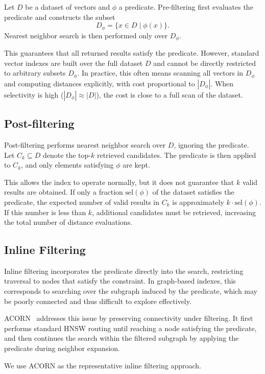 Let \( D \) be a dataset of vectors and \( \phi \) a predicate. Pre-filtering first evaluates the predicate and constructs the subset
\[
D_\phi = \{ x \in D \mid \phi(x) \}.
\]
Nearest neighbor search is then performed only over \( D_\phi \).

This guarantees that all returned results satisfy the predicate. However, standard vector indexes are built over the full dataset \( D \) and cannot be directly restricted to arbitrary subsets \( D_\phi \). In practice, this often means scanning all vectors in \( D_\phi \) and computing distances explicitly, with cost proportional to \( |D_\phi| \). When selectivity is high (\( |D_\phi| \approx |D| \)), the cost is close to a full scan of the dataset.

\subsection{Post-filtering}\label{sec:post-filtering}

Post-filtering performs nearest neighbor search over \( D \), ignoring the predicate. Let \( C_k \subseteq D \) denote the top-\(k\) retrieved candidates. The predicate is then applied to \( C_k \), and only elements satisfying \( \phi \) are kept.

This allows the index to operate normally, but it does not guarantee that \(k\) valid results are obtained. If only a fraction \( \text{sel}(\phi) \) of the dataset satisfies the predicate, the expected number of valid results in \( C_k \) is approximately \( k \cdot \text{sel}(\phi) \). If this number is less than \(k\), additional candidates must be retrieved, increasing the total number of distance evaluations.

\subsection{Inline Filtering}\label{sec:inline-filtering}

Inline filtering incorporates the predicate directly into the search, restricting traversal to nodes that satisfy the constraint. 
In graph-based indexes, this corresponds to searching over the subgraph induced by the predicate, which may be poorly connected and thus difficult to explore effectively.

ACORN~\cite{acorn} addresses this issue by preserving connectivity under filtering. 
It first performs standard HNSW routing until reaching a node satisfying the predicate, and then continues the search within the filtered subgraph by applying the predicate during neighbor expansion.

We use ACORN as the representative inline filtering approach.
